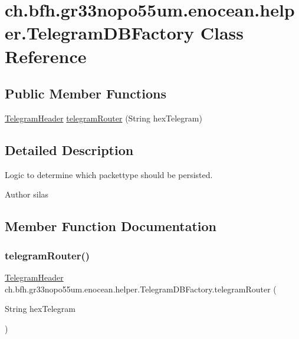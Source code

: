 \hypertarget{classch_1_1bfh_1_1gr33nopo55um_1_1enocean_1_1helper_1_1_telegram_d_b_factory}{}\section{ch.\+bfh.\+gr33nopo55um.\+enocean.\+helper.\+Telegram\+D\+B\+Factory Class Reference}
\label{classch_1_1bfh_1_1gr33nopo55um_1_1enocean_1_1helper_1_1_telegram_d_b_factory}
\subsection*{Public Member Functions}
\begin{DoxyCompactItemize}
\item 
\hyperlink{classch_1_1bfh_1_1gr33nopo55um_1_1enocean_1_1telegram_1_1_telegram_header}{Telegram\+Header} \hyperlink{classch_1_1bfh_1_1gr33nopo55um_1_1enocean_1_1helper_1_1_telegram_d_b_factory_a68b3deccf4fc3609a23f0854a606ab8d}{telegram\+Router} (String hex\+Telegram)
\end{DoxyCompactItemize}


\subsection{Detailed Description}
Logic to determine which packettype should be persisted.

\begin{DoxyAuthor}{Author}
silas 
\end{DoxyAuthor}


\subsection{Member Function Documentation}
\hypertarget{classch_1_1bfh_1_1gr33nopo55um_1_1enocean_1_1helper_1_1_telegram_d_b_factory_a68b3deccf4fc3609a23f0854a606ab8d}{}\label{classch_1_1bfh_1_1gr33nopo55um_1_1enocean_1_1helper_1_1_telegram_d_b_factory_a68b3deccf4fc3609a23f0854a606ab8d} 
\subsubsection{\texorpdfstring{telegram\+Router()}{telegramRouter()}}
{\footnotesize\ttfamily \hyperlink{classch_1_1bfh_1_1gr33nopo55um_1_1enocean_1_1telegram_1_1_telegram_header}{Telegram\+Header} ch.\+bfh.\+gr33nopo55um.\+enocean.\+helper.\+Telegram\+D\+B\+Factory.\+telegram\+Router (\begin{DoxyParamCaption}\item[{String}]{hex\+Telegram }\end{DoxyParamCaption})}


